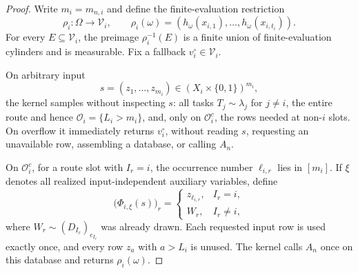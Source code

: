 \begin{proof}
Write \(m_i=m_{n,i}\) and define the finite-evaluation restriction
\begin{equation}\label{eq:step-012-output-restriction}
\rho_i:\Omega\to\mathcal V_i,
\qquad
\rho_i(\omega)
=(h_\omega(x_{i,1}),\ldots,h_\omega(x_{i,t_i})).
\end{equation}
For every \(E\subseteq\mathcal V_i\), the preimage
\(\rho_i^{-1}(E)\) is a finite union of finite-evaluation cylinders and is
measurable.  Fix a fallback \(v_i^\circ\in\mathcal V_i\).

On arbitrary input
\begin{equation}\label{eq:step-012-factor-input}
s=(z_1,\ldots,z_{m_i})
\in(X_i\times\{0,1\})^{m_i},
\end{equation}
the kernel samples without inspecting \(s\): all tasks \(T_j\sim\lambda_j\)
for \(j\ne i\), the entire route and hence
\(\mathcal O_i=\{L_i>m_i\}\), and, only on \(\mathcal O_i^c\), the rows
needed at non-\(i\) slots.  On overflow it immediately returns
\(v_i^\circ\), without reading \(s\), requesting an unavailable row,
assembling a database, or calling \(A_n\).

On \(\mathcal O_i^c\), for a route slot with \(I_r=i\), the occurrence
number \(\ell_{i,r}\) lies in \([m_i]\).  If \(\xi\) denotes all realized
input-independent auxiliary variables, define
\begin{equation}\label{eq:step-012-assembly-map}
\bigl(\Phi_{i,\xi}(s)\bigr)_r=
\begin{cases}
z_{\ell_{i,r}},&I_r=i,\\
W_r,&I_r\ne i,
\end{cases}
\end{equation}
where \(W_r\sim(D_{I_r})_{c_{I_r}}\) was already drawn.  Each requested
input row is used exactly once, and every row \(z_a\) with \(a>L_i\) is
unused.  The kernel calls \(A_n\) once on this database and returns
\(\rho_i(\omega)\).


\end{proof}
